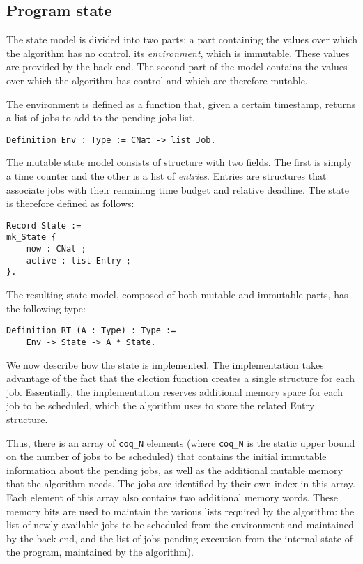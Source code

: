 	\subsection{Program state}

	The state model is divided into two parts: a part containing the values over which the algorithm has no control, its \emph{environment}, which is immutable. These values are provided by the back-end. The second part of the model contains the values over which the algorithm has control and which are therefore mutable.

	The environment is defined as a function that, given a certain timestamp, returns a list of jobs to add to the pending jobs list.
	\begin{verbatim}
Definition Env : Type := CNat -> list Job.
	\end{verbatim}

	The mutable state model consists of structure with two fields. The first is simply a time counter and the other is a list of \emph{entries}. Entries are structures that associate jobs with their remaining time budget and relative deadline. The state is therefore defined as follows:
	\begin{verbatim}
Record State := 
mk_State {
    now : CNat ;
    active : list Entry ;
}.
	\end{verbatim}

	The resulting state model, composed of both mutable and immutable parts, has the following type:
	\begin{verbatim}
Definition RT (A : Type) : Type :=
    Env -> State -> A * State.
	\end{verbatim}

	We now describe how the state is implemented.
	The implementation takes advantage of the fact that the election function creates a single structure for each job. Essentially, the implementation reserves additional memory space for each job to be scheduled, which the algorithm uses to store the related Entry structure.

	Thus, there is an array of \texttt{coq\_N} elements (where \texttt{coq\_N} is the static upper bound on the number of jobs to be scheduled) that contains the initial immutable information about the pending jobs, as well as the additional mutable memory that the algorithm needs. The jobs are identified by their own index in this array. Each element of this array also contains two additional memory words. These memory bits are used to maintain the various lists required by the algorithm: the list of newly available jobs to be scheduled from the environment and maintained by the back-end, and the list of jobs pending execution from the internal state of the program, maintained by the algorithm).

